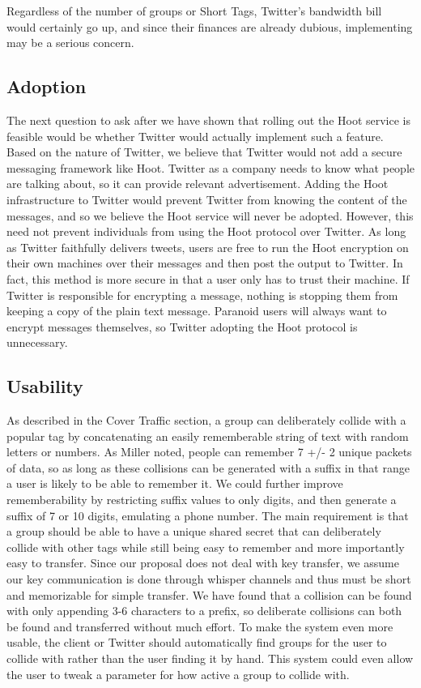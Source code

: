 Regardless of the number of groups or Short Tags, Twitter's bandwidth bill would certainly go up, and since their finances are already dubious, implementing \hoot may be a serious concern.

\subsection{Adoption}	

The next question to ask after we have shown that rolling out the Hoot service is feasible would be whether Twitter would actually implement such a feature. Based on the nature of Twitter, we believe that Twitter would not add a secure messaging framework like Hoot. Twitter as a company needs to know what people are talking about, so it can provide relevant advertisement. Adding the Hoot infrastructure to Twitter would prevent Twitter from knowing the content of the messages, and so we believe the Hoot service will never be adopted. However, this need not prevent individuals from using the Hoot protocol over Twitter. As long as Twitter faithfully delivers tweets, users are free to run the Hoot encryption on their own machines over their messages and then post the output to Twitter. In fact, this method is more secure in that a user only has to trust their machine. If Twitter is responsible for encrypting a message, nothing is stopping them from keeping a copy of the plain text message. Paranoid users will always want to encrypt messages themselves, so Twitter adopting the Hoot protocol is unnecessary.
		
\subsection{Usability}

As described in the Cover Traffic section, a group can deliberately collide with a popular tag by concatenating an easily rememberable string of text with random letters or numbers. As Miller\cite{miller56} noted, people can remember  
7 +/- 2 unique packets of data, so as long as these collisions can be generated with a suffix in that range a user is likely to be able to remember it. We could further improve rememberability by restricting suffix values to only digits, and then generate a suffix of 7 or 10 digits, emulating a phone number. The main requirement is that a group should be able to have a unique shared secret that can deliberately collide with other tags while still being easy to remember and more importantly easy to transfer. Since our proposal does not deal with key transfer, we assume our key communication is done through whisper channels and thus must be short and memorizable for simple transfer. We have found that a collision can be found with only appending 3-6 characters to a prefix, so deliberate collisions can both be found and transferred without much effort. To make the system even more usable, the client or Twitter should automatically find groups for the user to collide with rather than the user finding it by hand. This system could even allow the user to tweak a parameter for how active a group to collide with.

